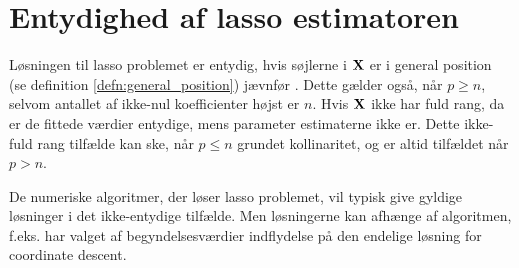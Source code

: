 \section{Entydighed af lasso estimatoren}
Løsningen til lasso problemet er entydig, hvis søjlerne i \(\mathbf{X}\) er i general position (se definition \ref{defn:general_position}) jævnfør \citep{lasso_unique}.
Dette gælder også, når \(p \geq n\), selvom antallet af ikke-nul koefficienter højst er \(n\).
Hvis \(\mathbf{X}\) ikke har fuld rang, da er de fittede værdier entydige, mens parameter estimaterne ikke er.
Dette ikke-fuld rang tilfælde kan ske, når \(p \leq n\) grundet kollinaritet, og er altid tilfældet når \(p>n\).

De numeriske algoritmer, der løser lasso problemet, vil typisk give gyldige løsninger i det ikke-entydige tilfælde.
Men løsningerne kan afhænge af algoritmen, f.eks. har valget af begyndelsesværdier indflydelse på den endelige løsning for coordinate descent.

%

\newpage
